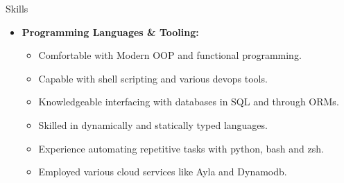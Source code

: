 \documentclass[11pt,oneside]{article}
\newenvironment{ressection}[1]{
	\vspace{4pt}
	{\fontfamily{phv}\selectfont\Large#1}
	\begin{itemize}
	\vspace{3pt}
}{
	\end{itemize}
}
\newcommand{\resitem}[1]{
	\vspace{-4pt}
	\item \begin{flushleft} #1 \end{flushleft}
}
\newcommand{\ressubitem}[1]{
	\vspace{-1pt}
	\item \begin{flushleft} #1 \end{flushleft}
}
\newenvironment{reslist}[1]{
	\resitem{\textbf{#1}}
	\vspace{-5pt}
	\begin{itemize}
}{
	\end{itemize}
}
\begin{document}
\begin{ressection}{Skills}
	\begin{reslist}{Programming Languages \& Tooling:}
		\ressubitem{Comfortable with Modern OOP and functional programming.}
		\ressubitem{Capable with shell scripting and various devops tools.}
		\ressubitem{Knowledgeable interfacing with databases in SQL and through ORMs.}
		\ressubitem{Skilled in dynamically and statically typed languages. } 
		\ressubitem{Experience automating repetitive tasks with python, bash and zsh.}
		\ressubitem{Employed various cloud services like Ayla and Dynamodb.} 
\end{reslist}
\end{ressection}
\end{document}
